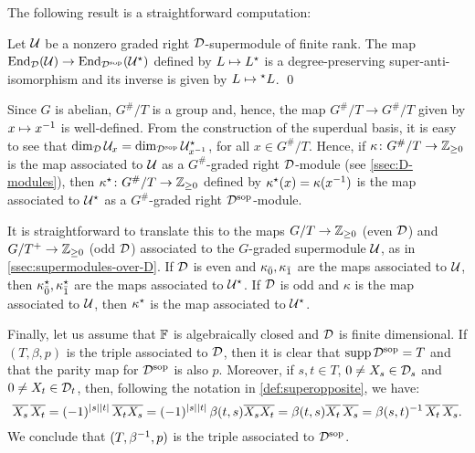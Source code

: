 The following result is a straightforward computation:

\begin{prop}\label{prop:dual-super-anti-iso}
    Let $\mathcal U$ be a nonzero graded right $\mathcal{D}$-supermodule of finite rank. 
    The map $\operatorname{End}_{\mathcal{D}} (\mathcal U) \rightarrow \operatorname{End}_{\mathcal{D}^{\mathrm{sop}}} (\mathcal U^\star)$ defined by $L \mapsto L^\star$ is a degree-preserving super-anti-isomorphism and its inverse is given by $L \mapsto {}^\star L$. \qed
\end{prop}

Since $G$ is abelian, $G^\#/T$ is a group and, hence, the map $G^\#/T \to G^\#/T$ given by $x \mapsto x^{-1}$ is well-defined. 
From the construction of the superdual basis, it is easy to see that $\dim_{\mathcal{D}} \mathcal U_x = \dim_{\mathcal{D}^{\mathrm{sop}}} \mathcal U^\star_{x^{-1}}$, for all $x \in G^\#/T$. 
Hence, if $\kappa\colon G^\#/T \to \mathbb{Z}_{\geq 0}$ is the map associated to $\mathcal U$ as a $G^\#$-graded right $\mathcal{D}$-module (see \cref{ssec:D-modules}), then $\kappa^\star \colon G^\#/T \to \mathbb{Z}_{\geq 0}$ defined by $\kappa^\star (x) = \kappa (x^{-1})$ is the map associated to $\mathcal U^\star$ as a $G^\#$-graded right $\mathcal{D}^{\mathrm{sop}}$-module.

It is straightforward to translate this to the maps $G/T \to \mathbb{Z}_{\geq 0}$ (even $\mathcal{D}$) and $G/T^+ \to \mathbb{Z}_{\geq 0}$ (odd $\mathcal{D}$) associated to the $G$-graded supermodule $\mathcal U$, as in \cref{ssec:supermodules-over-D}. 
If $\mathcal{D}$ is even and $\kappa_{\bar{0}}, \kappa_{\bar{1}}$ are the maps associated to $\mathcal U$, then $\kappa_{\bar{0}}^\star, \kappa_{\bar{1}}^\star$ are the maps associated to $\mathcal U^\star$. 
If $\mathcal{D}$ is odd and $\kappa$ is the map associated to $\mathcal U$, then $\kappa^\star$ is the map associated to $\mathcal U^\star$.

Finally, let us assume that $\mathbb{F}$ is algebraically closed and $\mathcal{D}$ is finite dimensional. 
If $(T, \beta, p)$ is the triple associated to $\mathcal{D}$, then it is clear that $\operatorname{supp} \mathcal{D}^{\mathrm{sop}} = T$ and that the parity map for $\mathcal{D}^{\mathrm{sop}}$ is also $p$. 
Moreover, if $s,t \in T$, $0 \neq X_s \in \mathcal{D}_s$ and $0 \neq X_t \in \mathcal{D}_t$, then, following the notation in \cref{def:superopposite}, we have:
\[
    \overline{X_s} \, \overline{X_t} = (-1)^{|s||t|} \, \overline{X_tX_s} = (-1)^{|s||t|}\,  \beta(t, s) \overline{X_sX_t} = \beta(t, s) \overline{X_t} \, \overline{X_s} = \beta(s, t)^{-1} \, \overline{X_t} \, \overline{X_s}.
\]
We conclude that $(T,\beta^{-1}, p)$ is the triple associated to $\mathcal{D}^{\mathrm{sop}}$.